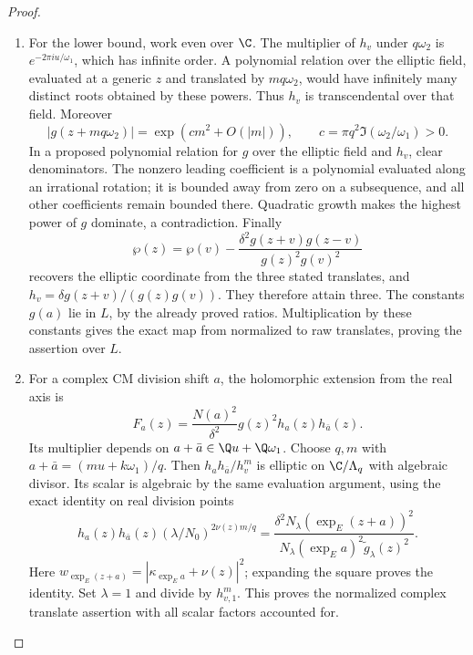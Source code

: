 \begin{proof}
\begin{enumerate}[label=\arabic*.,leftmargin=0pt,labelsep=.5em]
\begin{enumerate}[label={$\langle2\rangle$\arabic*.},leftmargin=1.3em,labelsep=.5em]
\item  For the lower bound, work even over $\C$. The multiplier of
$h_v$ under $q\omega_2$ is $e^{-2\pi iu/\omega_1}$,
which has infinite order. A polynomial relation over the elliptic
field, evaluated at a generic $z$ and translated by $mq\omega_2$,
would have infinitely many distinct roots obtained by these
powers. Thus $h_v$ is transcendental over that field. Moreover
\[
 |g(z+mq\omega_2)|=\exp(c m^2+O(|m|)),
 \qquad c=\pi q^2\Im(\omega_2/\omega_1)>0.
\]
In a proposed polynomial relation for $g$ over the elliptic field
and $h_v$, clear denominators. The nonzero leading coefficient
is a polynomial evaluated along an irrational rotation; it is
bounded away from zero on a subsequence, and all other
coefficients remain bounded there. Quadratic growth makes the
highest power of $g$ dominate, a contradiction. Finally
\[
 \wp(z)=\wp(v)-
 \frac{\delta^2g(z+v)g(z-v)}{g(z)^2g(v)^2}
\]
recovers the elliptic coordinate from the three stated translates,
and $h_v=\delta g(z+v)/(g(z)g(v))$. They therefore attain three.
The constants $g(a)$ lie in $L$, by the already proved ratios.
Multiplication by these constants gives the exact map from
normalized to raw translates, proving the assertion over $L$.


\item  For a complex CM division shift $a$, the holomorphic extension
from the real axis is
\[
 F_a(z)=\frac{N(a)^2}{\delta^2}g(z)^2h_a(z)h_{\bar a}(z).
\]
Its multiplier depends on $a+\bar a\in\Q u+\Q\omega_1$.
Choose $q,m$ with $a+\bar a=(mu+k\omega_1)/q$.
Then $h_ah_{\bar a}/h_v^m$ is elliptic on $\C/\Lambda_q$
with algebraic divisor. Its scalar is algebraic by the same
evaluation argument, using the exact identity on real division
points
\[
 h_a(z)h_{\bar a}(z)(\lambda/N_0)^{2\nu(z)m/q}
 =\frac{\delta^2N_\lambda(\exp_E(z+a))^2}
        {N_\lambda(\exp_Ea)^2\widetilde g_\lambda(z)^2}.
\]
Here $w_{\exp_E(z+a)}=|\kappa_{\exp_Ea}+\nu(z)|^2$;
expanding the square proves the identity. Set $\lambda=1$
and divide by $h_{v,1}^m$. This proves the normalized complex
translate assertion with all scalar factors accounted for.

 
\end{enumerate}


\end{enumerate}
\end{proof}
